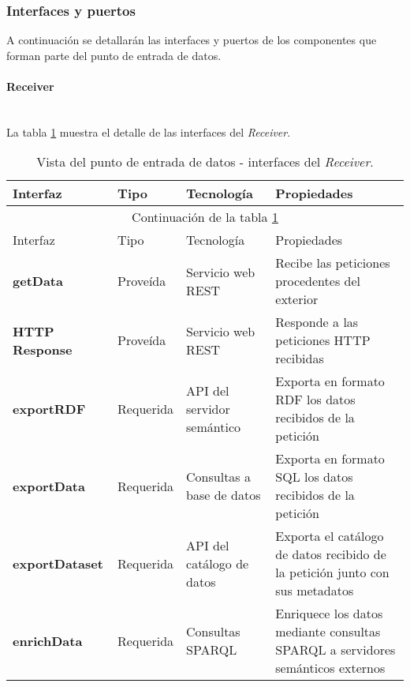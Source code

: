 \subsubsection{Interfaces y puertos}
A continuación se detallarán las interfaces y puertos de los componentes que forman parte del punto de entrada de datos. 

\paragraph{Receiver} \hfill \\
La tabla \ref{interfaces_receiver_receiver} muestra el detalle de las interfaces del \textit{Receiver}.
\begin{longtable}[c]{|p{25mm}|p{20mm}|p{30mm}|p{60mm}|}
 \caption{Vista del punto de entrada de datos - interfaces del \textit{Receiver}.\label{interfaces_receiver_receiver}}\\

 \hline
 	Interfaz & Tipo & Tecnología & Propiedades\\
 \hline
 \hline
 \endfirsthead
 \hline
 \multicolumn{4}{|c|}{Continuación de la tabla \ref{interfaces_receiver_receiver}}\\
 \hline
 	Interfaz & Tipo & Tecnología & Propiedades\\
 \hline
 \hline
 \endhead
 \hline
 \endfoot
 
	\textbf{getData} & Proveída & Servicio web REST & Recibe las peticiones procedentes del exterior \\
	\hline
		
	\textbf{HTTP Response} & Proveída & Servicio web REST & Responde a las peticiones HTTP recibidas \\
	\hline
	
	\textbf{exportRDF} & Requerida & API del servidor semántico & Exporta en formato RDF los datos recibidos de la petición \\
	\hline
	
	\textbf{exportData} & Requerida & Consultas a base de datos & Exporta en formato SQL los datos recibidos de la petición \\
	\hline
	
	\textbf{exportDataset} & Requerida & API del catálogo de datos & Exporta el catálogo de datos recibido de la petición junto con sus metadatos \\
	\hline
	
	\textbf{enrichData} & Requerida & Consultas SPARQL & Enriquece los datos mediante consultas SPARQL a servidores semánticos externos \\
\hline
\hline

 \end{longtable}
 
